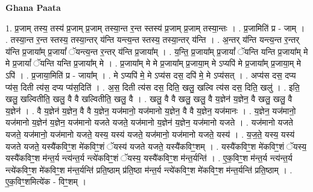 \documentclass[17pt]{extarticle}
\begin{document}
\textbf{Ghana Paata } \newline

1. प्र॒जाम् तस्य॒ तस्य॑ प्र॒जाम् प्र॒जाम् तस्या॒न्त र॒न्त स्तस्य॑ प्र॒जाम् प्र॒जाम् तस्या॒न्तः । . प्र॒जामिति॑ प्र - जाम् । . तस्या॒न्त र॒न्त स्तस्य॒ तस्या॒न्तर् य॑न्ति यन्त्य॒न्त स्तस्य॒ तस्या॒न्तर् य॑न्ति । . अ॒न्तर् य॑न्ति यन्त्य॒न्त र॒न्तर् य॑न्ति प्र॒जाया᳚म् प्र॒जायां᳚ ॅयन्त्य॒न्त र॒न्तर् य॑न्ति प्र॒जाया᳚म् । . य॒न्ति॒ प्र॒जाया᳚म् प्र॒जायां᳚ ॅयन्ति यन्ति प्र॒जाया᳚म् मे मे प्र॒जायां᳚ ॅयन्ति यन्ति प्र॒जाया᳚म् मे । . प्र॒जाया᳚म् मे मे प्र॒जाया᳚म् प्र॒जाया॒म् मे ऽप्यपि॑ मे प्र॒जाया᳚म् प्र॒जाया॒म् मे ऽपि॑ । . प्र॒जाया॒मिति॑ प्र - जाया᳚म् । . मे ऽप्यपि॑ मे॒ मे ऽप्य॑स दस॒ दपि॑ मे॒ मे ऽप्य॑सत् । . अप्य॑स दस॒ दप्य प्य॑स॒ दिती त्य॑स॒ दप्य प्य॑स॒दिति॑ । . अ॒स॒ दिती त्य॑स दस॒ दिति॒ खलु॒ खल्वि त्य॑स दस॒ दिति॒ खलु॑ । . इति॒ खलु॒ खल्वितीति॒ खलु॒ वै वै खल्वितीति॒ खलु॒ वै । . खलु॒ वै वै खलु॒ खलु॒ वै य॒ज्ञेन॑ य॒ज्ञेन॒ वै खलु॒ खलु॒ वै य॒ज्ञेन॑ । . वै य॒ज्ञेन॑ य॒ज्ञेन॒ वै वै य॒ज्ञेन॒ यज॑मानो॒ यज॑मानो य॒ज्ञेन॒ वै वै य॒ज्ञेन॒ यज॑मानः । . य॒ज्ञेन॒ यज॑मानो॒ यज॑मानो य॒ज्ञेन॑ य॒ज्ञेन॒ यज॑मानो यजते यजते॒ यज॑मानो य॒ज्ञेन॑ य॒ज्ञेन॒ यज॑मानो यजते । . यज॑मानो यजते यजते॒ यज॑मानो॒ यज॑मानो यजते॒ यस्य॒ यस्य॑ यजते॒ यज॑मानो॒ यज॑मानो यजते॒ यस्य॑ । . य॒ज॒ते॒ यस्य॒ यस्य॑ यजते यजते॒ यस्यै॑कविꣳ॒॒श मे॑कविꣳ॒॒शं ॅयस्य॑ यजते यजते॒ यस्यै॑कविꣳ॒॒शम् । . यस्यै॑कविꣳ॒॒श मे॑कविꣳ॒॒शं ॅयस्य॒ यस्यै॑कविꣳ॒॒श म॑न्त॒र्य न्त्य॑न्त॒र्य न्त्ये॑कविꣳ॒॒शं ॅयस्य॒ यस्यै॑कविꣳ॒॒श म॑न्त॒र्यन्ति॑ । . ए॒क॒विꣳ॒॒श म॑न्त॒र्य न्त्य॑न्त॒र्य न्त्ये॑कविꣳ॒॒श मे॑कविꣳ॒॒श म॑न्त॒र्यन्ति॑ प्रति॒ष्ठाम् प्र॑ति॒ष्ठा म॑न्त॒र्य न्त्ये॑कविꣳ॒॒श मे॑कविꣳ॒॒श म॑न्त॒र्यन्ति॑ प्रति॒ष्ठाम् । . ए॒क॒विꣳ॒॒शमित्ये॑क - विꣳ॒॒शम् । \newline
\end{document}
